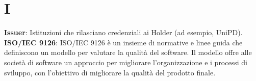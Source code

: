 \section*{I}
\textbf{Issuer}: Istituzioni che rilasciano credenziali ai Holder (ad esempio, UniPD).\\
\textbf{ISO/IEC 9126}: ISO/IEC 9126 è un insieme di normative e linee guida che definiscono un modello per valutare la qualità del software. Il modello offre alle società di software un approccio per migliorare l'organizzazione e i processi di sviluppo, con l'obiettivo di migliorare la qualità del prodotto finale.\\

